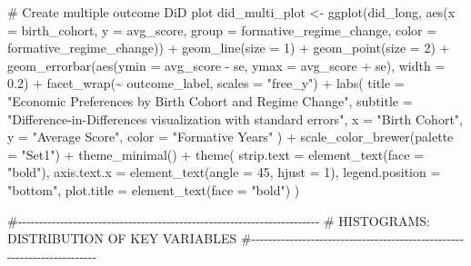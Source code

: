 \documentclass[
  letterpaper,
  DIV=11,
  numbers=noendperiod]{scrartcl}
\newenvironment{Shaded}{\begin{snugshade}}{\end{snugshade}}
\newcommand{\AttributeTok}[1]{\textcolor[rgb]{0.40,0.45,0.13}{#1}}
\newcommand{\CommentTok}[1]{\textcolor[rgb]{0.37,0.37,0.37}{#1}}
\newcommand{\DecValTok}[1]{\textcolor[rgb]{0.68,0.00,0.00}{#1}}
\newcommand{\FloatTok}[1]{\textcolor[rgb]{0.68,0.00,0.00}{#1}}
\newcommand{\FunctionTok}[1]{\textcolor[rgb]{0.28,0.35,0.67}{#1}}
\newcommand{\NormalTok}[1]{\textcolor[rgb]{0.00,0.23,0.31}{#1}}
\newcommand{\OtherTok}[1]{\textcolor[rgb]{0.00,0.23,0.31}{#1}}
\newcommand{\SpecialCharTok}[1]{\textcolor[rgb]{0.37,0.37,0.37}{#1}}
\newcommand{\StringTok}[1]{\textcolor[rgb]{0.13,0.47,0.30}{#1}}
\begin{document}
\begin{Shaded}
\begin{Highlighting}[]
\CommentTok{\# Create multiple outcome DiD plot}
\NormalTok{did\_multi\_plot }\OtherTok{\textless{}{-}} \FunctionTok{ggplot}\NormalTok{(did\_long, }\FunctionTok{aes}\NormalTok{(}\AttributeTok{x =}\NormalTok{ birth\_cohort, }\AttributeTok{y =}\NormalTok{ avg\_score, }
                                   \AttributeTok{group =}\NormalTok{ formative\_regime\_change, }
                                   \AttributeTok{color =}\NormalTok{ formative\_regime\_change)) }\SpecialCharTok{+}
  \FunctionTok{geom\_line}\NormalTok{(}\AttributeTok{size =} \DecValTok{1}\NormalTok{) }\SpecialCharTok{+}
  \FunctionTok{geom\_point}\NormalTok{(}\AttributeTok{size =} \DecValTok{2}\NormalTok{) }\SpecialCharTok{+}
  \FunctionTok{geom\_errorbar}\NormalTok{(}\FunctionTok{aes}\NormalTok{(}\AttributeTok{ymin =}\NormalTok{ avg\_score }\SpecialCharTok{{-}}\NormalTok{ se, }\AttributeTok{ymax =}\NormalTok{ avg\_score }\SpecialCharTok{+}\NormalTok{ se), }\AttributeTok{width =} \FloatTok{0.2}\NormalTok{) }\SpecialCharTok{+}
  \FunctionTok{facet\_wrap}\NormalTok{(}\SpecialCharTok{\textasciitilde{}}\NormalTok{ outcome\_label, }\AttributeTok{scales =} \StringTok{"free\_y"}\NormalTok{) }\SpecialCharTok{+}
  \FunctionTok{labs}\NormalTok{(}
    \AttributeTok{title =} \StringTok{"Economic Preferences by Birth Cohort and Regime Change"}\NormalTok{,}
    \AttributeTok{subtitle =} \StringTok{"Difference{-}in{-}Differences visualization with standard errors"}\NormalTok{,}
    \AttributeTok{x =} \StringTok{"Birth Cohort"}\NormalTok{,}
    \AttributeTok{y =} \StringTok{"Average Score"}\NormalTok{,}
    \AttributeTok{color =} \StringTok{"Formative Years"}
\NormalTok{  ) }\SpecialCharTok{+}
  \FunctionTok{scale\_color\_brewer}\NormalTok{(}\AttributeTok{palette =} \StringTok{"Set1"}\NormalTok{) }\SpecialCharTok{+}
  \FunctionTok{theme\_minimal}\NormalTok{() }\SpecialCharTok{+}
  \FunctionTok{theme}\NormalTok{(}
    \AttributeTok{strip.text =} \FunctionTok{element\_text}\NormalTok{(}\AttributeTok{face =} \StringTok{"bold"}\NormalTok{),}
    \AttributeTok{axis.text.x =} \FunctionTok{element\_text}\NormalTok{(}\AttributeTok{angle =} \DecValTok{45}\NormalTok{, }\AttributeTok{hjust =} \DecValTok{1}\NormalTok{),}
    \AttributeTok{legend.position =} \StringTok{"bottom"}\NormalTok{,}
    \AttributeTok{plot.title =} \FunctionTok{element\_text}\NormalTok{(}\AttributeTok{face =} \StringTok{"bold"}\NormalTok{)}
\NormalTok{  )}

\CommentTok{\#{-}{-}{-}{-}{-}{-}{-}{-}{-}{-}{-}{-}{-}{-}{-}{-}{-}{-}{-}{-}{-}{-}{-}{-}{-}{-}{-}{-}{-}{-}{-}{-}{-}{-}{-}{-}{-}{-}{-}{-}{-}{-}{-}{-}{-}{-}{-}{-}{-}{-}{-}{-}{-}{-}{-}{-}{-}{-}{-}{-}{-}{-}{-}{-}{-}{-}{-}{-}{-}{-}{-}}
\CommentTok{\# HISTOGRAMS: DISTRIBUTION OF KEY VARIABLES}
\CommentTok{\#{-}{-}{-}{-}{-}{-}{-}{-}{-}{-}{-}{-}{-}{-}{-}{-}{-}{-}{-}{-}{-}{-}{-}{-}{-}{-}{-}{-}{-}{-}{-}{-}{-}{-}{-}{-}{-}{-}{-}{-}{-}{-}{-}{-}{-}{-}{-}{-}{-}{-}{-}{-}{-}{-}{-}{-}{-}{-}{-}{-}{-}{-}{-}{-}{-}{-}{-}{-}{-}{-}{-}}


\end{Highlighting}
\end{Shaded}
\end{document}
